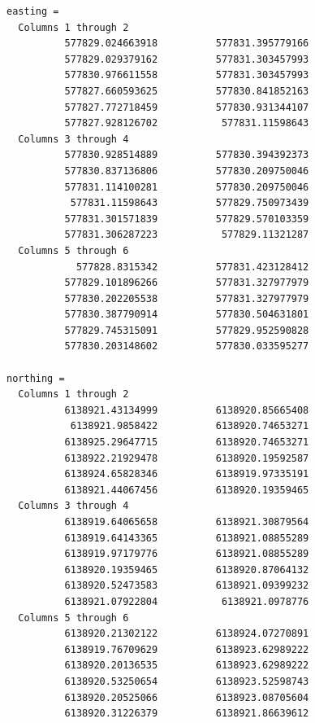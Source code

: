 \documentclass[spanish,12pt,a4paper,titlepage]{report}
\begin{document}
\begin{verbatim}
easting =
  Columns 1 through 2
          577829.024663918          577831.395779166
          577829.029379162          577831.303457993
          577830.976611558          577831.303457993
          577827.660593625          577830.841852163
          577827.772718459          577830.931344107
          577827.928126702           577831.11598643
  Columns 3 through 4
          577830.928514889          577830.394392373
          577830.837136806          577830.209750046
          577831.114100281          577830.209750046
           577831.11598643          577829.750973439
          577831.301571839          577829.570103359
          577831.306287223           577829.11321287
  Columns 5 through 6
            577828.8315342          577831.423128412
          577829.101896266          577831.327977979
          577830.202205538          577831.327977979
          577830.387790914          577830.504631801
          577829.745315091          577829.952590828
          577830.203148602          577830.033595277

northing =
  Columns 1 through 2
          6138921.43134999          6138920.85665408
           6138921.9858422          6138920.74653271
          6138925.29647715          6138920.74653271
          6138922.21929478          6138920.19592587
          6138924.65828346          6138919.97335191
          6138921.44067456          6138920.19359465
  Columns 3 through 4
          6138919.64065658          6138921.30879564
          6138919.64143365          6138921.08855289
          6138919.97179776          6138921.08855289
          6138920.19359465          6138920.87064132
          6138920.52473583          6138921.09399232
          6138921.07922804           6138921.0978776
  Columns 5 through 6
          6138920.21302122          6138924.07270891
          6138919.76709629          6138923.62989222
          6138920.20136535          6138923.62989222
          6138920.53250654          6138923.52598743
          6138920.20525066          6138923.08705604
          6138920.31226379          6138921.86639612
\end{verbatim}
\end{document}
